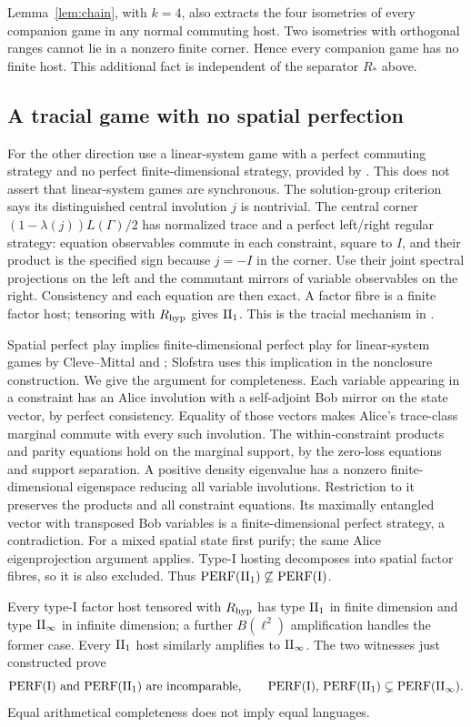 Lemma~\ref{lem:chain}, with $k=4$, also extracts the four
isometries of every companion game in any normal commuting host.
Two isometries with orthogonal ranges cannot lie in a nonzero finite
corner. Hence every companion game has no finite host. This additional
fact is independent of the separator $R_*$ above.

\subsection{A tracial game with no spatial perfection}
For the other direction use a linear-system game with a perfect
commuting strategy and no perfect finite-dimensional strategy,
provided by \cite{SlofstraNonclosed}.
This does not assert that linear-system games are synchronous.
The solution-group criterion \cite[Theorems 4--5]{CLS} says its
distinguished central involution $j$ is nontrivial.
The central corner $(1-\lambda(j))L(\Gamma)/2$ has normalized trace
and a perfect left/right regular strategy: equation observables
commute in each constraint, square to $I$, and their product is the
specified sign because $j=-I$ in the corner.
Use their joint spectral projections on the left and the
commutant mirrors of variable observables on the right.
Consistency and each equation are then exact.
A factor fibre is a finite factor host; tensoring with $R_{\rm hyp}$ gives
$\mathrm{II}_1$. This is the tracial mechanism in
\cite[Proposition 7.4]{ReadType}.

Spatial perfect play implies finite-dimensional perfect play for
linear-system games by Cleve--Mittal \cite{CM} and
\cite[Theorem 5]{CLS}; Slofstra \cite{SlofstraNonclosed} uses this
implication in the nonclosure construction. We give the argument
for completeness. Each variable appearing in a constraint has an
Alice involution with a self-adjoint Bob mirror on the state vector,
by perfect consistency. Equality of those vectors makes Alice's
trace-class marginal commute with every such involution.
The within-constraint products and parity equations hold on the
marginal support, by the zero-loss equations and support separation.
A positive density eigenvalue has a nonzero finite-dimensional
eigenspace reducing all variable involutions.
Restriction to it preserves the products and all constraint equations.
Its maximally entangled vector with transposed Bob variables is a
finite-dimensional perfect strategy, a contradiction.
For a mixed spatial state first purify; the same Alice eigenprojection
argument applies. Type-I hosting decomposes into spatial factor
fibres, so it is also excluded.
Thus $\mathrm{PERF}(\mathrm{II}_1)\not\subseteq\mathrm{PERF}(\mathrm I)$.

Every type-I factor host tensored with $R_{\rm hyp}$ has type $\mathrm{II}_1$ in finite
dimension and type $\mathrm{II}_\infty$ in infinite dimension; a further
$B(\ell^2)$ amplification handles the former case.
Every $\mathrm{II}_1$ host similarly amplifies to $\mathrm{II}_\infty$.
The two witnesses just constructed prove
\[
 \perf(\mathrm I)\ \text{and}\ \perf(\II_1)
 \text{ are incomparable},\qquad
 \perf(\mathrm I),\,\perf(\II_1)
 \subsetneq\perf(\II_\infty).
\]
Equal arithmetical completeness does not imply equal languages.
